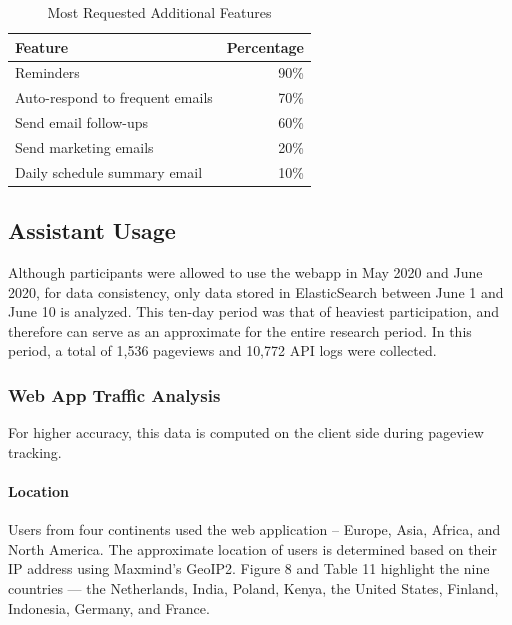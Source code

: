 \documentclass{article}
\begin{document}
\begin{table}[!htb]
	\begin{minipage}{1\linewidth}
		\caption{Most Requested Additional Features}
		\centering
		\begin{tabular}{lr}
			\hline
			\textbf{Feature}                & \textbf{Percentage} \\
			\hline
			Reminders                       & 90\%                \\
			Auto-respond to frequent emails & 70\%                \\
			Send email follow-ups           & 60\%                \\
			Send marketing emails           & 20\%                \\
			Daily schedule summary email    & 10\%                \\
			\hline
		\end{tabular}
	\end{minipage}%
\end{table}

\subsection{Assistant Usage}

Although participants were allowed to use the webapp in May 2020 and June 2020, for data consistency, only data stored in ElasticSearch between June 1 and June 10 is analyzed. This ten-day period was that of heaviest participation, and therefore can serve as an approximate for the entire research period. In this period, a total of 1,536 pageviews and 10,772 API logs were collected.

\subsubsection{Web App Traffic Analysis}

For higher accuracy, this data is computed on the client side during pageview tracking.

\paragraph{Location}

Users from four continents used the web application -- Europe, Asia, Africa, and North America. The approximate location of users is determined based on their IP address using Maxmind's GeoIP2. Figure 8 and Table 11 highlight the nine countries --- the Netherlands, India, Poland, Kenya, the United States, Finland, Indonesia, Germany, and France.
\end{document}
